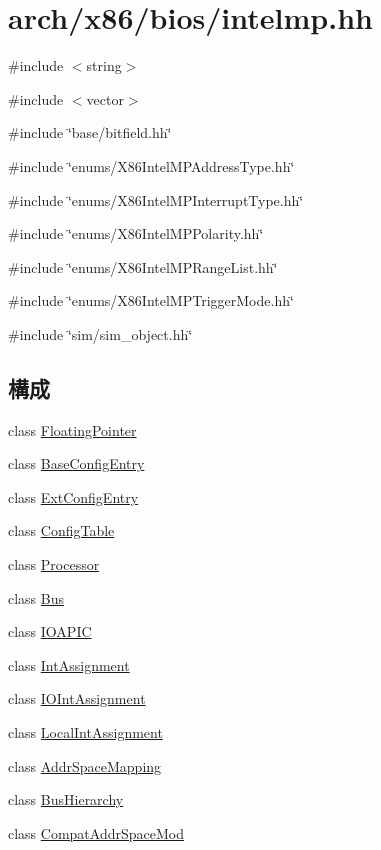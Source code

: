 \hypertarget{intelmp_8hh}{
\section{arch/x86/bios/intelmp.hh}
\label{intelmp_8hh}
}
{\ttfamily \#include $<$string$>$}\par
{\ttfamily \#include $<$vector$>$}\par
{\ttfamily \#include \char`\"{}base/bitfield.hh\char`\"{}}\par
{\ttfamily \#include \char`\"{}enums/X86IntelMPAddressType.hh\char`\"{}}\par
{\ttfamily \#include \char`\"{}enums/X86IntelMPInterruptType.hh\char`\"{}}\par
{\ttfamily \#include \char`\"{}enums/X86IntelMPPolarity.hh\char`\"{}}\par
{\ttfamily \#include \char`\"{}enums/X86IntelMPRangeList.hh\char`\"{}}\par
{\ttfamily \#include \char`\"{}enums/X86IntelMPTriggerMode.hh\char`\"{}}\par
{\ttfamily \#include \char`\"{}sim/sim\_\-object.hh\char`\"{}}\par
\subsection*{構成}
\begin{DoxyCompactItemize}
\item 
class \hyperlink{classX86ISA_1_1IntelMP_1_1FloatingPointer}{FloatingPointer}
\item 
class \hyperlink{classX86ISA_1_1IntelMP_1_1BaseConfigEntry}{BaseConfigEntry}
\item 
class \hyperlink{classX86ISA_1_1IntelMP_1_1ExtConfigEntry}{ExtConfigEntry}
\item 
class \hyperlink{classX86ISA_1_1IntelMP_1_1ConfigTable}{ConfigTable}
\item 
class \hyperlink{classX86ISA_1_1IntelMP_1_1Processor}{Processor}
\item 
class \hyperlink{classX86ISA_1_1IntelMP_1_1Bus}{Bus}
\item 
class \hyperlink{classX86ISA_1_1IntelMP_1_1IOAPIC}{IOAPIC}
\item 
class \hyperlink{classX86ISA_1_1IntelMP_1_1IntAssignment}{IntAssignment}
\item 
class \hyperlink{classX86ISA_1_1IntelMP_1_1IOIntAssignment}{IOIntAssignment}
\item 
class \hyperlink{classX86ISA_1_1IntelMP_1_1LocalIntAssignment}{LocalIntAssignment}
\item 
class \hyperlink{classX86ISA_1_1IntelMP_1_1AddrSpaceMapping}{AddrSpaceMapping}
\item 
class \hyperlink{classX86ISA_1_1IntelMP_1_1BusHierarchy}{BusHierarchy}
\item 
class \hyperlink{classX86ISA_1_1IntelMP_1_1CompatAddrSpaceMod}{CompatAddrSpaceMod}
\end{DoxyCompactItemize}
